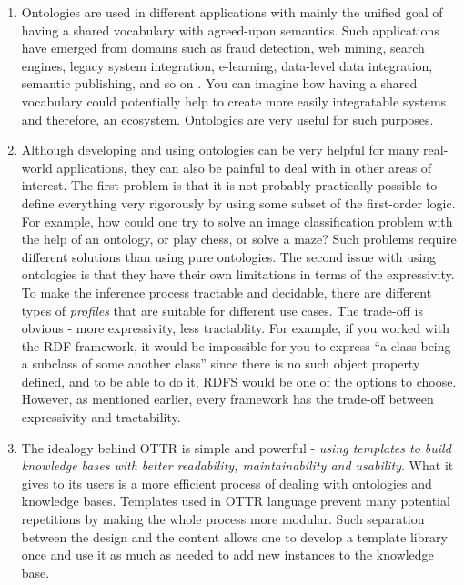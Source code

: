 \label{chap:conclusions}

\begin{enumerate}[wide=0pt]

\item Ontologies are used in different applications with mainly the unified goal of having a shared vocabulary 
with agreed-upon semantics. Such applications have emerged from domains such as fraud detection, 
web mining, search engines, legacy system integration, e-learning, data-level data integration, semantic 
publishing, and so on \cite{cmariakeet,ontotext}. You can imagine how having a shared vocabulary could 
potentially help to create more easily integratable systems and therefore, an ecosystem. Ontologies are 
very useful for such purposes.

\item Although developing and using ontologies can be very helpful for many real-world applications, they can 
also be painful to deal with in other areas of interest. The first problem is that it is not probably 
practically possible to define everything very rigorously by using some subset of the first-order logic. 
For example, how could one try to solve an image classification problem with the help of an ontology, or 
play chess, or solve a maze? Such problems require different solutions than using pure ontologies.
The second issue with using ontologies is that they have their own limitations in terms of the 
expressivity. To make the inference process tractable and decidable, there are different types of 
\textit{profiles} that are suitable for different use cases. The trade-off is obvious - more expressivity, 
less tractablity. For example, if you worked with the RDF framework, it would be impossible for you to 
express ``a class being a subclass of some another class'' since there is no such object property 
defined, and to be able to do it, RDFS would be one of the options to choose. However, as mentioned 
earlier, every framework has the trade-off between expressivity and tractability.


\item The idealogy behind OTTR is simple and powerful - \textit{using templates to build knowledge bases with 
better readability, maintainability and usability}. What it gives to its users is a more efficient 
process 
of dealing with ontologies and knowledge bases. Templates used in OTTR language prevent many potential 
repetitions by making the whole process more modular. Such separation between the design and the content 
allows one to develop a template library once and use it as much as needed to add new instances to the 
knowledge base.


\end{enumerate}
